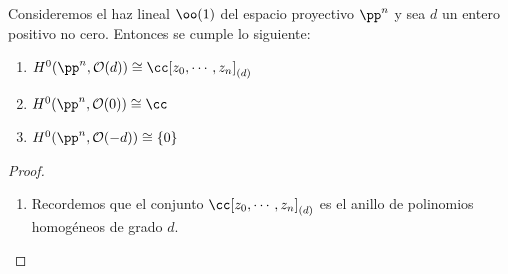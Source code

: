 	\begin{theorem}\label{seccionesproyectivo}
		Consideremos el haz lineal $\oo(1)$ del espacio proyectivo $\pp^n$ y sea $d$ un entero positivo no cero. Entonces se cumple lo siguiente:
		\begin{enumerate}
			\item $H^0(\pp^n, \mathcal{O}(d))\cong \cc[z_0,\cdots,z_n]_{(d)}$
			\item $H^0(\pp^n, \mathcal{O}(0))\cong \cc$
			\item $H^0(\pp^n, \mathcal{O}(-d))\cong\{0\}$
		\end{enumerate}
	\end{theorem}
	\begin{proof} $ $
		\begin{enumerate}
			\item Recordemos que el conjunto $\cc[z_0,\cdots,z_n]_{(d)}$ es el anillo de polinomios homogéneos de grado $d$.
			

\end{enumerate}
\end{proof}
